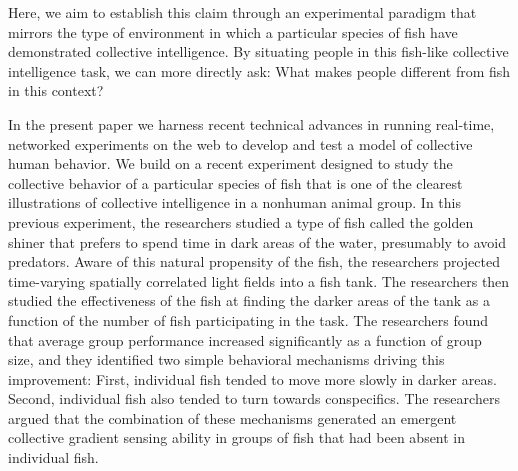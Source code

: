 \documentclass[12pt,letterpaper]{article}
\begin{document}
Here, we aim to establish this claim through an experimental paradigm that mirrors the type of environment in which a particular species of fish have demonstrated collective intelligence. By situating people in this fish-like collective intelligence task, we can more directly ask: What makes people different from fish in this context?







In the present paper we harness recent technical advances in running
real-time, networked experiments on the web
\cite{hawkins_conducting_2014} to develop and test a model of
collective human behavior.  We build on a recent experiment designed
to study the collective behavior of a particular species of fish
\cite{berdahl_emergent_2013} that is one of the clearest illustrations
of collective intelligence in a nonhuman animal group.  In this
previous experiment, the researchers studied a type of fish called the
golden shiner that prefers to spend time in dark areas of the water,
presumably to avoid predators.  Aware of this natural propensity of
the fish, the researchers projected time-varying spatially correlated
light fields into a fish tank.  The researchers then studied the
effectiveness of the fish at finding the darker areas of the tank as a
function of the number of fish participating in the task.  The
researchers found that average group performance increased
significantly as a function of group size, and they identified two
simple behavioral mechanisms driving this improvement:
First, individual fish tended to move more slowly in darker areas.
Second, individual fish also tended to turn towards conspecifics.  The
researchers argued that the combination of these mechanisms generated
an emergent collective gradient sensing ability in groups of fish that
had been absent in individual fish.
\end{document}
